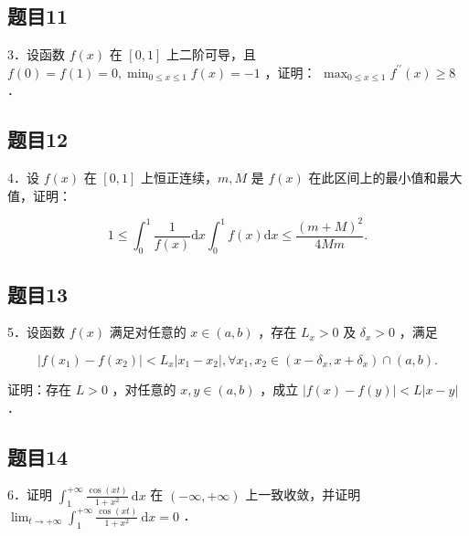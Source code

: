 \documentclass{article}
\begin{document}
\subsection{题目11}
3．设函数 \(f(x)\) 在 \([0,1]\) 上二阶可导，且 \(f(0)=f(1)=0, \min _{0 \leq x \leq 1} f(x)=-1\) ，证明： \(\max _{0 \leq x \leq 1} f^{\prime \prime}(x) \geq 8\) ．

\subsection{题目12}
4．设 \(f(x)\) 在 \([0,1]\) 上恒正连续，\(m, M\) 是 \(f(x)\) 在此区间上的最小值和最大值，证明：

\[
1 \leq \int_{0}^{1} \frac{1}{f(x)} \mathrm{d} x \int_{0}^{1} f(x) \mathrm{d} x \leq \frac{(m+M)^{2}}{4 M m} .
\]

\subsection{题目13}
5．设函数 \(f(x)\) 满足对任意的 \(x \in(a, b)\) ，存在 \(L_{x}>0\) 及 \(\delta_{x}>0\) ，满足

\[
\left|f\left(x_{1}\right)-f\left(x_{2}\right)\right|<L_{x}\left|x_{1}-x_{2}\right|, \forall x_{1}, x_{2} \in\left(x-\delta_{x}, x+\delta_{x}\right) \cap(a, b) .
\]

证明：存在 \(L>0\) ，对任意的 \(x, y \in(a, b)\) ，成立 \(|f(x)-f(y)|<L|x-y|\) ．

\subsection{题目14}
6．证明 \(\int_{1}^{+\infty} \frac{\cos (x t)}{1+x^{2}} \mathrm{~d} x\) 在 \((-\infty,+\infty)\) 上一致收敛，并证明 \(\lim _{t \rightarrow+\infty} \int_{1}^{+\infty} \frac{\cos (x t)}{1+x^{2}} \mathrm{~d} x=0\) ．
\end{document}
